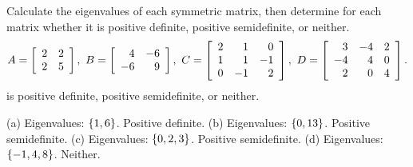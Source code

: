 \documentclass{ximera}
\begin{document}
\begin{problem}
  Calculate the eigenvalues of each symmetric matrix, then determine
  for each matrix whether it is positive definite, positive
  semidefinite, or neither.
  \begin{equation*}
    A = \startmat{rr}
      2 & 2 \\
      2 & 5 \\
    \stopmat,\quad
    B = \startmat{rr}
      4  & -6 \\
      -6 &  9 \\
    \stopmat,\quad
    C = \startmat{rrr}
      2 &  1 &  0 \\
      1 &  1 & -1 \\
      0 & -1 &  2 \\
    \stopmat,\quad
    D = \startmat{rrr}
      3 & -4 &  2 \\
     -4 &  4 &  0 \\
      2 &  0 &  4 \\
    \stopmat.
  \end{equation*}
  is positive definite, positive semidefinite, or neither.
  \begin{solution}
    (a) Eigenvalues: $\set{1,6}$. Positive definite.
    (b) Eigenvalues: $\set{0,13}$. Positive semidefinite.
    (c) Eigenvalues: $\set{0,2,3}$. Positive semidefinite.
    (d) Eigenvalues: $\set{-1,4,8}$. Neither.
  \end{solution}
\end{problem}
\end{document}

